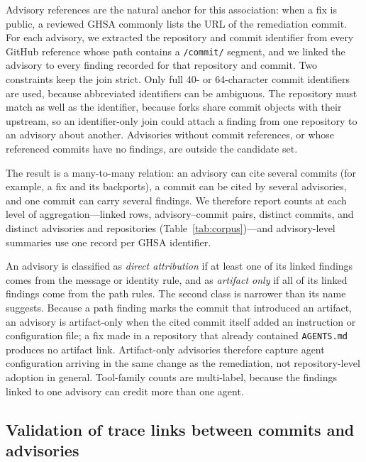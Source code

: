 \documentclass[smallextended,natbib]{svjour3}
\newcommand{\tool}[1]{\texttt{#1}}
\begin{document}
Advisory references are the natural anchor for this association: when a fix is
public, a reviewed GHSA commonly lists the URL of the remediation commit.  For
each advisory, we extracted the repository and commit identifier from every
GitHub reference whose path contains a \tool{/commit/} segment, and we linked
the advisory to every finding recorded for that repository and commit.  Two
constraints keep the join strict.  Only full 40- or 64-character commit
identifiers are used, because abbreviated identifiers can be ambiguous.  The
repository must match as well as the identifier, because forks share commit
objects with their upstream, so an identifier-only join could attach a finding
from one repository to an advisory about another.  Advisories without commit
references, or whose referenced commits have no findings, are outside the
candidate set.

The result is a many-to-many relation:  an advisory can cite several commits
(for example, a fix and its backports), a commit can be cited by several
advisories, and one commit can carry several findings.  We therefore report
counts at each level of aggregation---linked rows, advisory--commit pairs,
distinct commits, and distinct advisories and repositories
(Table~\ref{tab:corpus})---and advisory-level summaries use one record per GHSA
identifier.

An advisory is classified as \emph{direct attribution} if at least one of its
linked findings comes from the message or identity rule, and as
\emph{artifact only} if all of its linked findings come from the path rules.
The second class is narrower than its name suggests.  Because a path finding
marks the commit that introduced an artifact, an advisory is artifact-only when
the cited commit itself added an instruction or configuration file; a fix made
in a repository that already contained \tool{AGENTS.md} produces no artifact
link.  Artifact-only advisories therefore capture agent configuration arriving
in the same change as the remediation, not repository-level adoption in
general.
Tool-family counts are multi-label, because the findings linked to one advisory
can credit more than one agent.

\subsection{Validation of trace links between commits and advisories}
\label{sec:validation}
\end{document}
